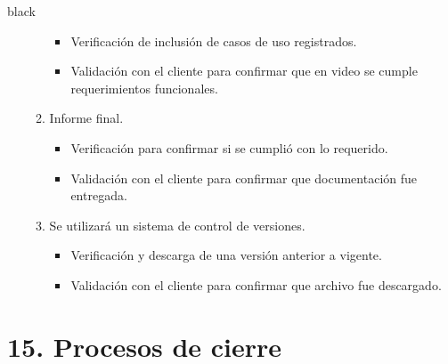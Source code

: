 \documentclass[
11pt, %
codirector, %
]{charter}
\begin{document}
\begin{consigna}{black}
\begin{enumerate}
\begin{enumerate}
\begin{itemize}
				\item Verificación de inclusión de casos de uso registrados. 
				\item Validación con el cliente para confirmar que en video se cumple requerimientos funcionales. 
			\end{itemize}
		\item Informe final.
			\begin{itemize}
				\item Verificación para confirmar si se cumplió con lo requerido. 
				\item Validación con el cliente para confirmar que documentación fue entregada. 
			\end{itemize}
		\item Se utilizará un sistema de control de versiones.
			\begin{itemize}
				\item Verificación y descarga de una versión anterior a vigente.
				\item Validación con el cliente para confirmar que archivo fue descargado.
			\end{itemize}
	\end{enumerate}

\end{enumerate}

\end{consigna}

\section{15. Procesos de cierre}    
\label{sec:cierre}
\end{document}
